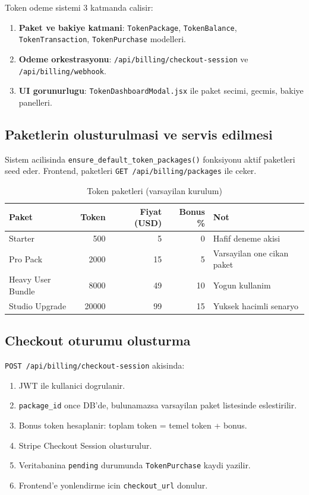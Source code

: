 \documentclass[11pt,a4paper]{article}
\begin{document}
Token odeme sistemi 3 katmanda calisir:
\begin{enumerate}[leftmargin=1.5em]
	\item \textbf{Paket ve bakiye katmani}: \texttt{TokenPackage}, \texttt{TokenBalance}, \texttt{TokenTransaction}, \texttt{TokenPurchase} modelleri.
	\item \textbf{Odeme orkestrasyonu}: \texttt{/api/billing/checkout-session} ve \texttt{/api/billing/webhook}.
	\item \textbf{UI gorunurlugu}: \texttt{TokenDashboardModal.jsx} ile paket secimi, gecmis, bakiye panelleri.
\end{enumerate}

\subsection{Paketlerin olusturulmasi ve servis edilmesi}

Sistem acilisinda \texttt{ensure\_default\_token\_packages()} fonksiyonu aktif paketleri seed eder.
Frontend, paketleri \texttt{GET /api/billing/packages} ile ceker.

\begin{table}[h]
\centering
\begin{tabularx}{\textwidth}{@{}lrrrX@{}}
\toprule
Paket & Token & Fiyat (USD) & Bonus \% & Not \\
\midrule
Starter & 500 & 5 & 0 & Hafif deneme akisi \\
Pro Pack & 2000 & 15 & 5 & Varsayilan one cikan paket \\
Heavy User Bundle & 8000 & 49 & 10 & Yogun kullanim \\
Studio Upgrade & 20000 & 99 & 15 & Yuksek hacimli senaryo \\
\bottomrule
\end{tabularx}
\caption{Token paketleri (varsayilan kurulum)}
\end{table}

\subsection{Checkout oturumu olusturma}

\texttt{POST /api/billing/checkout-session} akisinda:
\begin{enumerate}[leftmargin=1.5em]
	\item JWT ile kullanici dogrulanir.
	\item \texttt{package\_id} once DB'de, bulunamazsa varsayilan paket listesinde eslestirilir.
	\item Bonus token hesaplanir: toplam token = temel token + bonus.
	\item Stripe Checkout Session olusturulur.
	\item Veritabanina \texttt{pending} durumunda \texttt{TokenPurchase} kaydi yazilir.
	\item Frontend'e yonlendirme icin \texttt{checkout\_url} donulur.
\end{enumerate}
\end{document}
